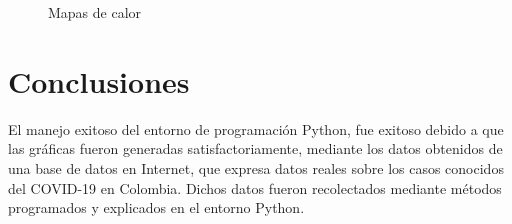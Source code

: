 \documentclass[conference,compsoc,onecolumn]{IEEEtran}
\begin{document}
\begin{figure}[H]
    \centering
    \hspace{2.1mm}
    \caption{Mapas de calor}
    \label{mosaico}
\end{figure}




\section{Conclusiones}
\label{sec:conclusions}
El manejo exitoso del entorno de programación Python, fue exitoso debido a que las gráficas fueron generadas satisfactoriamente, mediante los datos obtenidos de una base de datos en Internet, que expresa datos reales sobre los casos conocidos del COVID-19 en Colombia. Dichos datos fueron recolectados mediante métodos programados y explicados en el entorno Python. 
\nocite{*}
\label{sec:biblio}


\end{document}
